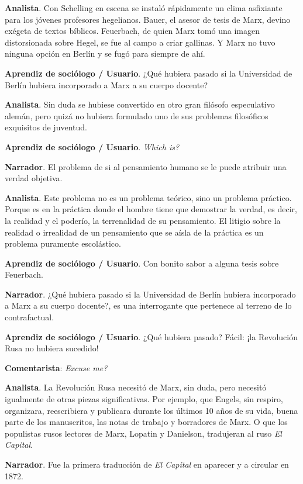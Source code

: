 \documentclass[
]{interact}
\begin{document}
\textbf{Analista}. Con Schelling en escena se instaló rápidamente un
clima asfixiante para los jóvenes profesores hegelianos. Bauer, el
asesor de tesis de Marx, devino exégeta de textos bíblicos. Feuerbach,
de quien Marx tomó una imagen distorsionada sobre Hegel, se fue al campo
a criar gallinas. Y Marx no tuvo ninguna opción en Berlín y se fugó para
siempre de ahí.

\textbf{Aprendiz de sociólogo / Usuario}. ¿Qué hubiera pasado si la
Universidad de Berlín hubiera incorporado a Marx a su cuerpo docente?

\textbf{Analista}. Sin duda se hubiese convertido en otro gran filósofo
especulativo alemán, pero quizá no hubiera formulado uno de sus
problemas filosóficos exquisitos de juventud.

\textbf{Aprendiz de sociólogo / Usuario}. \emph{Which is?}

\textbf{Narrador}. El problema de si al pensamiento humano se le puede
atribuir una verdad objetiva.

\textbf{Analista}. Este problema no es un problema teórico, sino un
problema práctico. Porque es en la práctica donde el hombre tiene que
demostrar la verdad, es decir, la realidad y el poderío, la terrenalidad
de su pensamiento. El litigio sobre la realidad o irrealidad de un
pensamiento que se aísla de la práctica es un problema puramente
escolástico.

\textbf{Aprendiz de sociólogo / Usuario}. Con bonito sabor a alguna
tesis sobre Feuerbach.

\textbf{Narrador}. ¿Qué hubiera pasado si la Universidad de Berlín
hubiera incorporado a Marx a su cuerpo docente?, es una interrogante que
pertenece al terreno de lo contrafactual.

\textbf{Aprendiz de sociólogo / Usuario}. ¿Qué hubiera pasado? Fácil:
¡la Revolución Rusa no hubiera sucedido!

\textbf{Comentarista}: \emph{Excuse me?}

\textbf{Analista}. La Revolución Rusa necesitó de Marx, sin duda, pero
necesitó igualmente de otras piezas significativas. Por ejemplo, que
Engels, sin respiro, organizara, reescribiera y publicara durante los
últimos 10 años de su vida, buena parte de los manuscritos, las notas de
trabajo y borradores de Marx. O que los populistas rusos lectores de
Marx, Lopatin y Danielson, tradujeran al ruso \emph{El Capital}.

\textbf{Narrador}. Fue la primera traducción de \emph{El Capital} en
aparecer y a circular en 1872.
\end{document}
